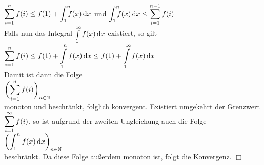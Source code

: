 \\[0.2cm]
\hspace*{1.3cm}
$\ds \sum\limits_{i=1}^n f(i) \leq f(1) + \dint{1}{n} f(x)\, \dr x$
\quad und \quad
$\dint{1}{n} f(x)\, \dr x \leq \sum\limits_{i=1}^{n-1} f(i)$
\\[0.2cm]
Falls nun das Integral $\int\limits_{1}^\infty f(x)\, \textrm{d} x$ existiert, so gilt
\\[0.2cm]
\hspace*{1.3cm}
$\displaystyle \sum\limits_{i=1}^{n} f(i) \leq f(1) + \int\limits_{1}^n f(x)\, \textrm{d} x \leq f(1) + \int\limits_{1}^\infty f(x)\, \textrm{d} x$
\\[0.2cm]
Damit ist dann die Folge 
\\
\hspace*{1.3cm}
$\displaystyle \biggl(\sum\limits_{i=1}^{n}  f(i)\biggr)_{n\in\mathbb{N}}$ 
\\ 
monoton und beschr\"ankt, folglich konvergent.  Existiert umgekehrt der Grenzwert
$\displaystyle \sum\limits_{i=1}^{\infty} f(i)$, so  ist aufgrund der zweiten Ungleichung auch die Folge
\\[0.3cm]
\hspace*{1.3cm}
$\displaystyle \biggl(\int_{1}^n f(x)\, \textrm{d} x\biggr)_{n\in\mathbb{N}}$
\\[0.3cm]
beschr\"ankt.  Da diese Folge au{\ss}erdem monoton ist, folgt die Konvergenz. \hspace*{\fill} $\Box$
\vspace*{0.3cm}

